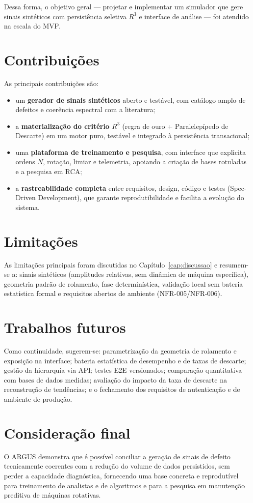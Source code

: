 Dessa forma, o objetivo geral --- projetar e implementar um simulador que gere
sinais sintéticos com persistência seletiva \(R^3\) e interface de análise ---
foi atendido na escala do MVP.

\section{Contribuições}

As principais contribuições são:

\begin{itemize}
  \item um \textbf{gerador de sinais sintéticos} aberto e testável, com
  catálogo amplo de defeitos e coerência espectral com a literatura;
  \item a \textbf{materialização do critério \(R^3\)} (regra de ouro +
  Paralelepípedo de Descarte) em um motor puro, testável e integrado à
  persistência transacional;
  \item uma \textbf{plataforma de treinamento e pesquisa}, com interface que
  explicita ordens \(N\), rotação, limiar e telemetria, apoiando a criação de
  bases rotuladas e a pesquisa em RCA;
  \item a \textbf{rastreabilidade completa} entre requisitos, design, código e
  testes (Spec-Driven Development), que garante reprodutibilidade e facilita a
  evolução do sistema.
\end{itemize}

\section{Limitações}

As limitações principais foram discutidas no Capítulo~\ref{cap:discussao} e
resumem-se a: sinais sintéticos (amplitudes relativas, sem dinâmica de máquina
específica), geometria padrão de rolamento, fase determinística, validação
local sem bateria estatística formal e requisitos abertos de ambiente
(NFR-005/NFR-006).

\section{Trabalhos futuros}

Como continuidade, sugerem-se: parametrização da geometria de rolamento e
exposição na interface; bateria estatística de desempenho e de taxas de
descarte; gestão da hierarquia via API; testes E2E versionados; comparação
quantitativa com bases de dados medidas; avaliação do impacto da taxa de
descarte na reconstrução de tendências; e o fechamento dos requisitos de
autenticação e de ambiente de produção.

\section{Consideração final}

O ARGUS demonstra que é possível conciliar a geração de sinais de defeito
tecnicamente coerentes com a redução do volume de dados persistidos, sem perder
a capacidade diagnóstica, fornecendo uma base concreta e reprodutível para
treinamento de analistas e de algoritmos e para a pesquisa em manutenção
preditiva de máquinas rotativas.
